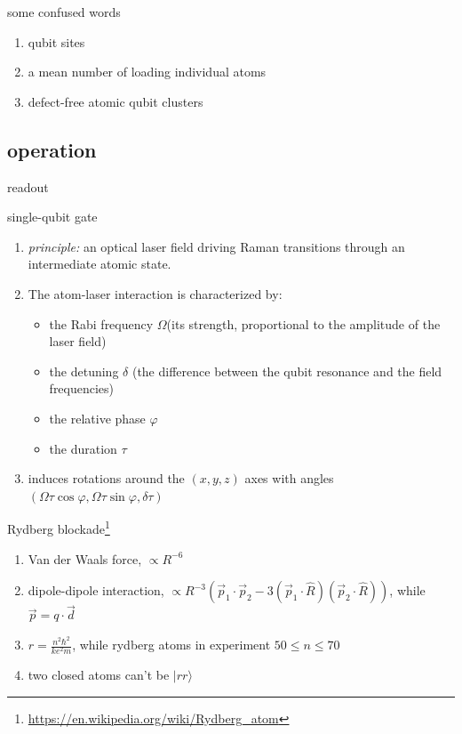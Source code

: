 \documentclass[18 pt]{beamer}
\begin{document}
\begin{frame}{some confused words}
  \begin{enumerate}
    \item qubit sites
    \item a mean number of loading individual atoms
    \item defect-free atomic qubit clusters
  \end{enumerate}
\end{frame}

\subsection{operation}
\begin{frame}{readout}
\end{frame}
\begin{frame}{single-qubit gate}
  \begin{enumerate}[itemsep=10pt]
    \item \textit{principle:} an optical laser field driving Raman transitions through an intermediate atomic state.
    \item The atom-laser interaction is characterized by:
    \begin{itemize}[itemsep = 5pt]
      \item the Rabi frequency \(\Omega\)(its strength, proportional to the amplitude of the laser field)
      \item the detuning \(\delta\) (the difference between the qubit resonance and the field frequencies) 
      \item the relative phase \(\varphi\)
      \item the duration \(\tau \)
    \end{itemize}
    \item induces rotations around the \((x,y,z)\) axes with angles \((\Omega\tau\cos{\varphi},\Omega\tau\sin{\varphi},\delta\tau)\)
  \end{enumerate}
\end{frame}
\begin{frame}{Rydberg blockade\footnote{\url{https://en.wikipedia.org/wiki/Rydberg_atom}}}
  \begin{enumerate}
    \item Van der Waals force, \(\propto R^{-6}\)
    \item dipole-dipole interaction, \(\propto R^{-3} \left( \vec{p}_1 \cdot \vec{p}_2 - 3(\vec{p}_1 \cdot \hat{R})(\vec{p}_2 \cdot \hat{R}) \right)
    \), while \(\vec{p} = q\cdot \vec{d}\)
    \item $r=\frac{n^{2}\hbar ^{2}}{ke^{2}m}$, while rydberg atoms in experiment $50\le n \le 70$
    \item two closed atoms can't be $|rr\rangle$
  \end{enumerate}
\end{frame}
\end{document}

